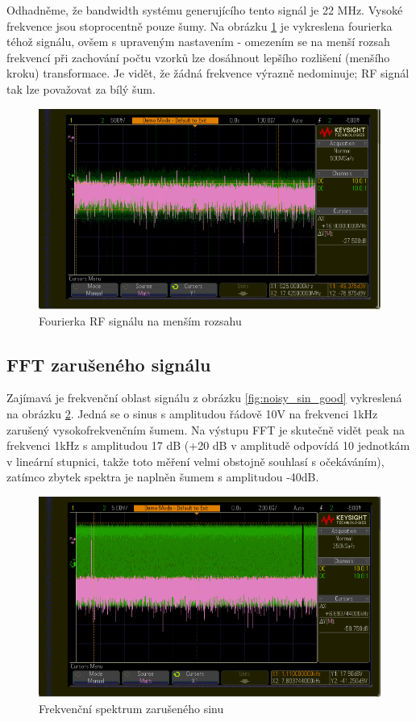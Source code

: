 \documentclass[twoside]{article}
\begin{document}
Odhadněme, že bandwidth systému generujícího tento signál je 22 MHz. Vysoké frekvence jsou stoprocentně pouze šumy. Na obrázku \ref{fig:fft_bandwidth}
je vykreslena fourierka téhož signálu, ovšem s upraveným nastavením - omezením se na menší rozsah frekvencí při zachování počtu vzorků lze dosáhnout lepšího rozlišení 
(menšího kroku) transformace. Je vidět, že žádná frekvence výrazně nedominuje; RF signál tak lze považovat za bílý šum. 

\begin{figure}[htbp]
	\centering

	\includegraphics[width=0.8\linewidth]{rf_fft_bandwidth.png         }
	\caption{Fourierka RF signálu na menším rozsahu}
	\label{fig:fft_bandwidth}
\end{figure}	

\subsection{FFT zarušeného signálu}

Zajímavá je frekvenční oblast signálu z obrázku \ref{fig:noisy_sin_good} vykreslená na obrázku \ref{fig:fft_noisy}.
Jedná se o sinus s amplitudou řádově 10V na frekvenci 1kHz zarušený vysokofrekvenčním šumem.
Na výstupu FFT je skutečně vidět peak na frekvenci 1kHz s amplitudou 17 dB (+20 dB v amplitudě odpovídá 10 jednotkám v lineární stupnici, takže toto měření velmi obstojně
souhlasí s očekáváním), zatímco zbytek spektra je naplněn šumem s amplitudou -40dB.

\begin{figure}[htbp]
	\centering
	\includegraphics[width=0.8\linewidth]{noisy_sinus_fft.png         }
	\caption{Frekvenční spektrum zarušeného sinu}
	\label{fig:fft_noisy}
\end{figure}	
\end{document}
